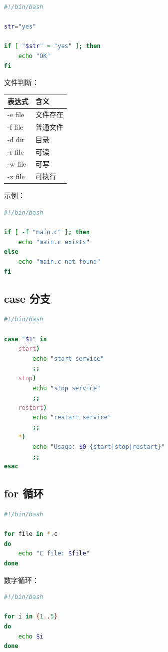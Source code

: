\documentclass[UTF8,a4paper,12pt]{ctexart}
\begin{document}
\begin{lstlisting}[language=bash]
#!/bin/bash

str="yes"

if [ "$str" = "yes" ]; then
    echo "OK"
fi
\end{lstlisting}

文件判断：

\begin{longtable}{p{4cm}p{10cm}}
\toprule
表达式 & 含义 \\
\midrule
-e file & 文件存在 \\
-f file & 普通文件 \\
-d dir & 目录 \\
-r file & 可读 \\
-w file & 可写 \\
-x file & 可执行 \\
\bottomrule
\end{longtable}

示例：

\begin{lstlisting}[language=bash]
#!/bin/bash

if [ -f "main.c" ]; then
    echo "main.c exists"
else
    echo "main.c not found"
fi
\end{lstlisting}

\subsection{case 分支}

\begin{lstlisting}[language=bash]
#!/bin/bash

case "$1" in
    start)
        echo "start service"
        ;;
    stop)
        echo "stop service"
        ;;
    restart)
        echo "restart service"
        ;;
    *)
        echo "Usage: $0 {start|stop|restart}"
        ;;
esac
\end{lstlisting}

\subsection{for 循环}

\begin{lstlisting}[language=bash]
#!/bin/bash

for file in *.c
do
    echo "C file: $file"
done
\end{lstlisting}

数字循环：

\begin{lstlisting}[language=bash]
#!/bin/bash

for i in {1..5}
do
    echo $i
done
\end{lstlisting}
\end{document}
